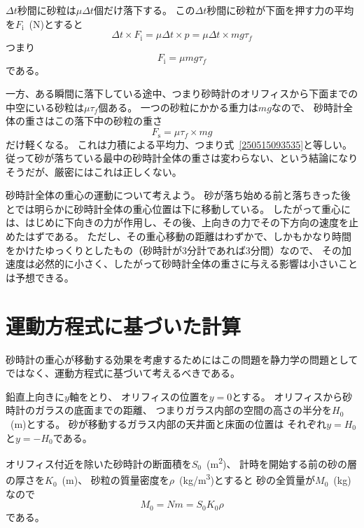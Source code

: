 \documentclass[]{article}
\begin{document}
$\Delta t$秒間に砂粒は$\mu \Delta t$個だけ落下する。
この$\Delta t$秒間に砂粒が下面を押す力の平均を$F_\mathrm{i}$~(\si{N})とすると
\begin{equation} \label{250512191540} 
  \Delta t \times F_\mathrm{i} = \mu \Delta t \times p = \mu \Delta t \times mg\tau_f
\end{equation}
つまり
\begin{equation} \label{250515093535} 
  F_\mathrm{i}   = \mu m g \tau_f
\end{equation}
である。


一方、ある瞬間に落下している途中、つまり砂時計のオリフィスから下面までの中空にいる砂粒は$\mu \tau_f$個ある。
一つの砂粒にかかる重力は$mg$なので、
砂時計全体の重さはこの落下中の砂粒の重さ
\begin{equation} \label{250513083619} 
   F_\mathrm{s} = \mu \tau_f\times mg 
\end{equation}
だけ軽くなる。
これは力積による平均力、つまり式~\eqref{250515093535}と等しい。
従って砂が落ちている最中の砂時計全体の重さは変わらない、という結論になりそうだが、厳密にはこれは正しくない。


砂時計全体の重心の運動について考えよう。
砂が落ち始める前と落ちきった後とでは明らかに砂時計全体の重心位置は下に移動している。
したがって重心には、はじめに下向きの力が作用し、その後、上向きの力でその下方向の速度を止めたはずである。
ただし、その重心移動の距離はわずかで、しかもかなり時間をかけたゆっくりとしたもの（砂時計が3分計であれば3分間）なので、
その加速度は必然的に小さく、したがって砂時計全体の重さに与える影響は小さいことは予想できる。


\section{運動方程式に基づいた計算}

砂時計の重心が移動する効果を考慮するためにはこの問題を静力学の問題としてではなく、運動方程式に基づいて考えるべきである。


鉛直上向きに$y$軸をとり、
オリフィスの位置を$y=0$とする。
オリフィスから砂時計のガラスの底面までの距離、
つまりガラス内部の空間の高さの半分を$H_0$~(\si{m})とする。
砂が移動するガラス内部の天井面と床面の位置は
それぞれ$y=H_0$と$y=-H_0$である。


オリフィス付近を除いた砂時計の断面積を$S_0$~(\si{m^2})、
計時を開始する前の砂の層の厚さを$K_0$~(m)、
砂粒の質量密度を$\rho$~(\si{kg/m^3})とすると
砂の全質量が$M_0$~(\si{kg})なので
\begin{equation} \label{250703152145} 
   M_0 = N m = S_0 K_0 \rho
\end{equation}
である。
\end{document}
